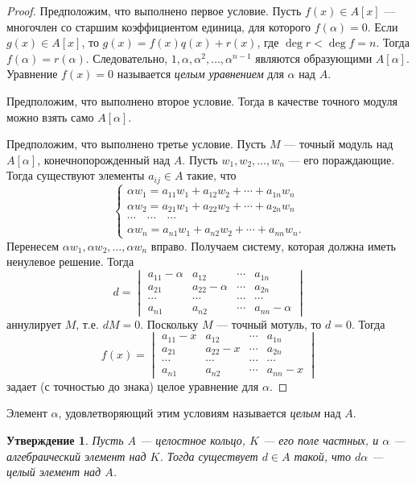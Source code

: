 \documentclass[12pt, titlepage, oneside]{amsbook}
\newtheorem{claim}[theorem]{Утверждение}
\theoremstyle{definition}
\theoremstyle{remark}
\begin{document}
\begin{proof}
Предположим, что выполнено первое условие. Пусть $f(x)\in A[x]$ --- многочлен со старшим коэффициентом единица, для которого $f(\alpha)=0$. Если $g(x)\in A[x]$, то $g(x)=f(x)q(x)+r(x)$, где $\deg r<\deg f=n$. Тогда $f(\alpha)=r(\alpha)$. Следовательно, $1,\alpha,\alpha^2,\ldots,\alpha^{n-1}$ являются образующими $A[\alpha]$. Уравнение $f(x)=0$ называется \emph{целым уравнением} для $\alpha$ над $A$.

Предположим, что выполнено второе условие. Тогда в качестве точного модуля можно взять само $A[\alpha]$.

Предположим, что выполнено третье условие. Пусть $M$ --- точный модуль над $A[\alpha]$, конечнопорожденный над $A$. Пусть $w_1,w_2,\ldots,w_n$ --- его пораждающие. Тогда существуют элементы $a_{ij}\in A$ такие, что $$\begin{cases}\alpha w_1=a_{11}w_1+a_{12}w_2+\cdots+a_{1n}w_n\\
\alpha w_2=a_{21}w_1+a_{22}w_2+\cdots+a_{2n}w_n\\
\cdots\quad\cdots\quad\cdots\\
\alpha w_n=a_{n1}w_1+a_{n2}w_2+\cdots+a_{nn}w_n.\end{cases}$$
Перенесем $\alpha w_1,\alpha w_2,\ldots,\alpha w_n$ вправо. Получаем систему, которая должна иметь ненулевое решение. Тогда $$d=\begin{vmatrix}a_{11}-\alpha & a_{12} & \cdots & a_{1n} \\
a_{21} & a_{22}-\alpha & \cdots & a_{2n}\\
\cdots & \cdots & \cdots & \cdots\\
a_{n1} & a_{n2} & \cdots & a_{nn}-\alpha
\end{vmatrix}$$ аннулирует $M$, т.е. $dM=0$. Поскольку $M$ --- точный мотуль, то $d=0$. Тогда $$f(x)=\begin{vmatrix}a_{11}-x & a_{12} & \cdots & a_{1n} \\
a_{21} & a_{22}-x & \cdots & a_{2n}\\
\cdots & \cdots & \cdots & \cdots\\
a_{n1} & a_{n2} & \cdots & a_{nn}-x
\end{vmatrix}$$ задает (с точностью до знака) целое уравнение для $\alpha$.
\end{proof}

Элемент $\alpha$, удовлетворяющий этим условиям называется \emph{целым} над $A$.

\begin{claim}
\label{Zel2}
Пусть $A$ --- целостное кольцо, $K$ --- его поле частных, и $\alpha$ --- алгебраический элемент над $K$. Тогда существует $d\in A$ такой, что $d\alpha$ --- целый элемент над $A$.
\end{claim}
\end{document}
